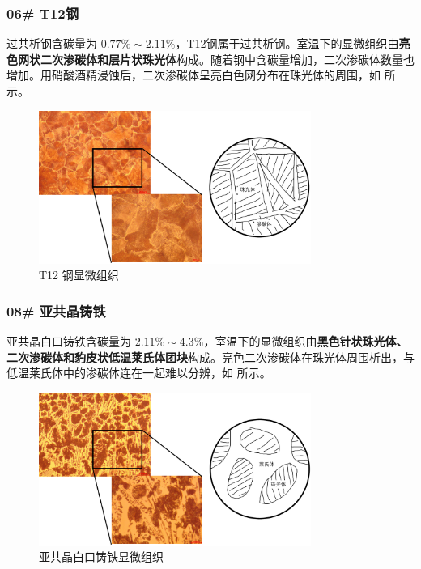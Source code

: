 \documentclass[a4paper,utf8]{article}
\begin{document}
        \subsubsection{06\# T12钢}
            过共析钢含碳量为 $0.77\%\sim 2.11\%$，T12钢属于过共析钢。室温下的显微组织由\textbf{亮色网状二次渗碳体和层片状珠光体}构成。随着钢中含碳量增加，二次渗碳体数量也增加。用硝酸酒精浸蚀后，二次渗碳体呈亮白色网分布在珠光体的周围，如 所示。
            \begin{figure}[!ht]
                \includegraphics[height=50mm]{result/4.pdf}
                \caption{T12 钢显微组织\label{fig:4}}
            \end{figure}

        \subsubsection{08\# 亚共晶铸铁}
            亚共晶白口铸铁含碳量为 $2.11\%\sim 4.3\%$，室温下的显微组织由\textbf{黑色针状珠光体、二次渗碳体和豹皮状低温莱氏体团块}构成。亮色二次渗碳体在珠光体周围析出，与低温莱氏体中的渗碳体连在一起难以分辨，如 所示。
            \begin{figure}[!ht]
                \includegraphics[height=50mm]{result/5.pdf}
                \caption{亚共晶白口铸铁显微组织\label{fig:5}}
            \end{figure}
\end{document}
